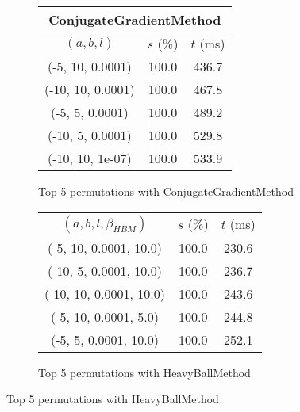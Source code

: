 \begin{figure}[H]
{\begin{subfigure}[ht]{.6\textwidth}
\begin{tabular}{|c|c|c|}
\multicolumn{3}{|c|}{ConjugateGradientMethod} \\
\hline
\rowcolor{gray!25}
$(a,b,l)$ & $s$ (\%) & $t$ (ms) \\
\hline
(-5, 10, 0.0001) & 100.0 & 436.7 \\
(-10, 10, 0.0001) & 100.0 & 467.8 \\
(-5, 5, 0.0001) & 100.0 & 489.2 \\
(-10, 5, 0.0001) & 100.0 & 529.8 \\
(-10, 10, 1e-07) & 100.0 & 533.9 \\
\hline
\end{tabular}
\caption{Top 5 permutations with ConjugateGradientMethod}
\label{subfig:param_comp_MatrixSquareSum_ConjugateGradientMethod_GoldenSectionSearch}
\end{subfigure}
\hfill
\begin{subfigure}[ht]{.6\textwidth}
\centering
{}
\begin{tabular}{|c|c|c|}
\hline
\rowcolor{gray!25}
\multicolumn{3}{|c|}{HeavyBallMethod} \\
\hline
\rowcolor{gray!25}
$(a,b,l,\beta_{HBM})$ & $s$ (\%) & $t$ (ms) \\
\hline
(-5, 10, 0.0001, 10.0) & 100.0 & 230.6 \\
(-10, 5, 0.0001, 10.0) & 100.0 & 236.7 \\
(-10, 10, 0.0001, 10.0) & 100.0 & 243.6 \\
(-5, 10, 0.0001, 5.0) & 100.0 & 244.8 \\
(-5, 5, 0.0001, 10.0) & 100.0 & 252.1 \\
\hline
\end{tabular}
\caption{Top 5 permutations with HeavyBallMethod}
\label{subfig:param_comp_MatrixSquareSum_HeavyBallMethod_GoldenSectionSearch}
\end{subfigure}
}
\end{figure}

